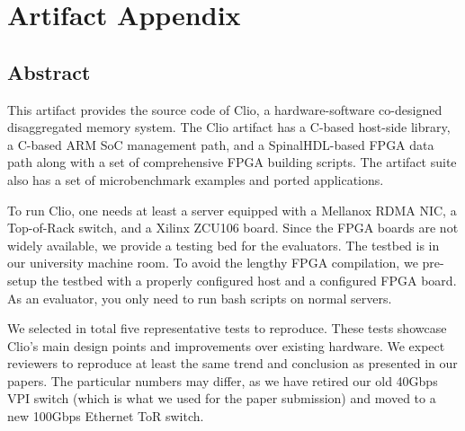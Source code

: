 \appendix
\section{Artifact Appendix}

\subsection{Abstract}
This artifact provides the source code of Clio, a hardware-software co-designed disaggregated memory system. The Clio artifact has a C-based host-side library, a C-based ARM SoC management path, and a SpinalHDL-based FPGA data path along with a set of comprehensive FPGA building scripts. The artifact suite also has a set of microbenchmark examples and ported applications.

To run Clio, one needs at least a server equipped with a Mellanox RDMA NIC, a Top-of-Rack switch, and a Xilinx ZCU106 board. Since the FPGA boards are not widely available, we provide a testing bed for the evaluators. The testbed is in our university machine room. To avoid the lengthy FPGA compilation, we pre-setup the testbed with a properly configured host and a configured FPGA board. As an evaluator, you only need to run bash scripts on normal servers.

We selected in total five representative tests to reproduce. These tests showcase Clio's main design points and improvements over existing hardware. We expect reviewers to reproduce at least the same trend and conclusion as presented in our papers. The particular numbers may differ, as we have retired our old 40Gbps VPI switch (which is what we used for the paper submission) and moved to a new 100Gbps Ethernet ToR switch.

